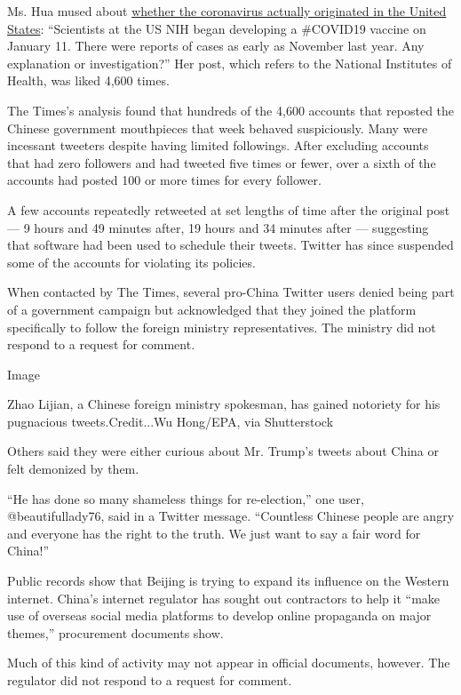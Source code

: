 Ms. Hua mused about
\href{https://twitter.com/SpokespersonCHN/status/1263053023137263616}{whether
the coronavirus actually originated in the United States}: ``Scientists
at the US NIH began developing a \#COVID19 vaccine on January 11. There
were reports of cases as early as November last year. Any explanation or
investigation?'' Her post, which refers to the National Institutes of
Health, was liked 4,600 times.

The Times's analysis found that hundreds of the 4,600 accounts that
reposted the Chinese government mouthpieces that week behaved
suspiciously. Many were incessant tweeters despite having limited
followings. After excluding accounts that had zero followers and had
tweeted five times or fewer, over a sixth of the accounts had posted 100
or more times for every follower.

A few accounts repeatedly retweeted at set lengths of time after the
original post --- 9 hours and 49 minutes after, 19 hours and 34 minutes
after --- suggesting that software had been used to schedule their
tweets. Twitter has since suspended some of the accounts for violating
its policies.

When contacted by The Times, several pro-China Twitter users denied
being part of a government campaign but acknowledged that they joined
the platform specifically to follow the foreign ministry
representatives. The ministry did not respond to a request for comment.

Image

Zhao Lijian, a Chinese foreign ministry spokesman, has gained notoriety
for his pugnacious tweets.Credit...Wu Hong/EPA, via Shutterstock

Others said they were either curious about Mr. Trump's tweets about
China or felt demonized by them.

``He has done so many shameless things for re-election,'' one user,
@beautifullady76, said in a Twitter message. ``Countless Chinese people
are angry and everyone has the right to the truth. We just want to say a
fair word for China!''

Public records show that Beijing is trying to expand its influence on
the Western internet. China's internet regulator has sought out
contractors to help it ``make use of overseas social media platforms to
develop online propaganda on major themes,'' procurement documents show.

Much of this kind of activity may not appear in official documents,
however. The regulator did not respond to a request for comment.

